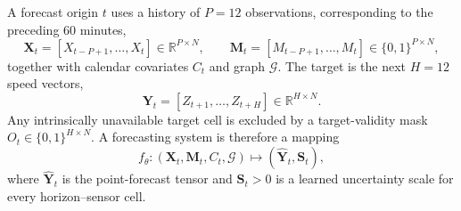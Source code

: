 \documentclass[pdflatex,sn-mathphys-num]{sn-jnl}
\begin{document}
A forecast origin $t$ uses a history of $P=12$ observations, corresponding to
the preceding 60 minutes,
\begin{equation}
 \mathbf{X}_t=[X_{t-P+1},\ldots,X_t]\in\mathbb{R}^{P\times N},\qquad
 \mathbf{M}_t=[M_{t-P+1},\ldots,M_t]\in\{0,1\}^{P\times N},
\end{equation}
together with calendar covariates $C_t$ and graph $\mathcal{G}$. The target is
the next $H=12$ speed vectors,
\begin{equation}
 \mathbf{Y}_t=[Z_{t+1},\ldots,Z_{t+H}]\in\mathbb{R}^{H\times N}.
 \label{eq:forecast-target}
\end{equation}
Any intrinsically unavailable target cell is excluded by a target-validity
mask $O_t\in\{0,1\}^{H\times N}$. A forecasting system is therefore a mapping
\begin{equation}
 f_{\theta}:(\mathbf{X}_t,\mathbf{M}_t,C_t,\mathcal{G})
 \longmapsto (\widehat{\mathbf{Y}}_t,\mathbf{S}_t),
 \label{eq:probabilistic-forecast-map}
\end{equation}
where $\widehat{\mathbf{Y}}_t$ is the point-forecast tensor and
$\mathbf{S}_t>0$ is a learned uncertainty scale for every horizon--sensor
cell.
\end{document}
